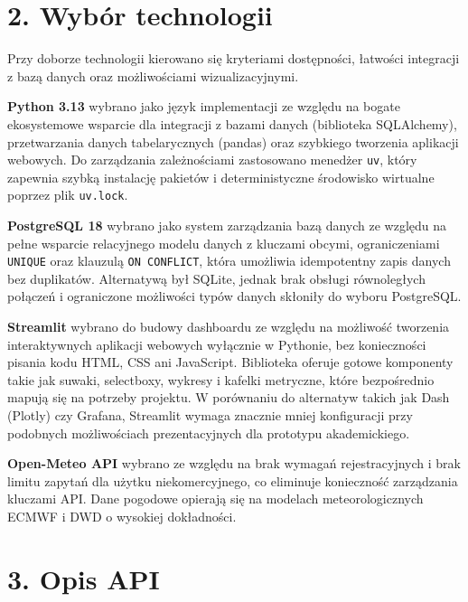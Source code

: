 \documentclass[12pt, a4paper]{article}
\begin{document}

\section*{\textbf{2. Wybór technologii}}

Przy doborze technologii kierowano się kryteriami dostępności, łatwości integracji
z bazą danych oraz możliwościami wizualizacyjnymi.

\textbf{Python 3.13} wybrano jako język implementacji ze względu na bogate
ekosystemowe wsparcie dla integracji z bazami danych (biblioteka SQLAlchemy),
przetwarzania danych tabelarycznych (pandas) oraz szybkiego tworzenia aplikacji
webowych. Do zarządzania zależnościami zastosowano menedżer \texttt{uv}, który
zapewnia szybką instalację pakietów i deterministyczne środowisko wirtualne
poprzez plik \texttt{uv.lock}.

\textbf{PostgreSQL 18} wybrano jako system zarządzania bazą danych ze względu na
pełne wsparcie relacyjnego modelu danych z kluczami obcymi, ograniczeniami
\texttt{UNIQUE} oraz klauzulą \texttt{ON CONFLICT}, która umożliwia
idempotentny zapis danych bez duplikatów. Alternatywą był SQLite, jednak brak
obsługi równoległych połączeń i ograniczone możliwości typów danych skłoniły
do wyboru PostgreSQL.

\textbf{Streamlit} wybrano do budowy dashboardu ze względu na możliwość tworzenia
interaktywnych aplikacji webowych wyłącznie w Pythonie, bez konieczności pisania
kodu HTML, CSS ani JavaScript. Biblioteka oferuje gotowe komponenty takie jak
suwaki, selectboxy, wykresy i kafelki metryczne, które bezpośrednio mapują się
na potrzeby projektu. W porównaniu do alternatyw takich jak Dash (Plotly) czy
Grafana, Streamlit wymaga znacznie mniej konfiguracji przy podobnych możliwościach
prezentacyjnych dla prototypu akademickiego.

\textbf{Open-Meteo API} wybrano ze względu na brak wymagań rejestracyjnych i brak
limitu zapytań dla użytku niekomercyjnego, co eliminuje konieczność zarządzania
kluczami API. Dane pogodowe opierają się na modelach meteorologicznych ECMWF
i DWD o wysokiej dokładności.


\section*{\textbf{3. Opis API}}
\end{document}
